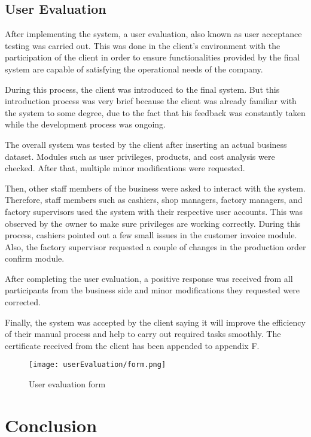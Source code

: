 \documentclass[12pt]{report}
\begin{document}
\section{User Evaluation}
After implementing the system, a user evaluation, also known as user acceptance testing was carried out. This was done in the client's environment with the participation of the client in order to ensure functionalities provided by the final system are capable of satisfying the operational needs of the company.

During this process, the client was introduced to the final system. But this introduction process was very brief because the client was already familiar with the system to some degree, due to the fact that his feedback was constantly taken while the development process was ongoing.

The overall system was tested by the client after inserting an actual business dataset. Modules such as user privileges, products, and cost analysis were checked. After that, multiple minor modifications were requested.

Then, other staff members of the business were asked to interact with the system. Therefore, staff members such as cashiers, shop managers, factory managers, and factory supervisors used the system with their respective user accounts. This was observed by the owner to make sure privileges are working correctly. During this process, cashiers pointed out a few small issues in the customer invoice module. Also, the factory supervisor requested a couple of changes in the production order confirm module.

After completing the user evaluation, a positive response was received from all participants from the business side and minor modifications they requested were corrected.

Finally, the system was accepted by the client saying it will improve the efficiency of their manual process and help to carry out required tasks smoothly. The certificate received from the client has been appended to appendix F.

\begin{figure}[H]
	\centering
	\texttt{[image: userEvaluation/form.png]}
	\caption{User evaluation form}
\end{figure}

\chapter{Conclusion}
\end{document}
